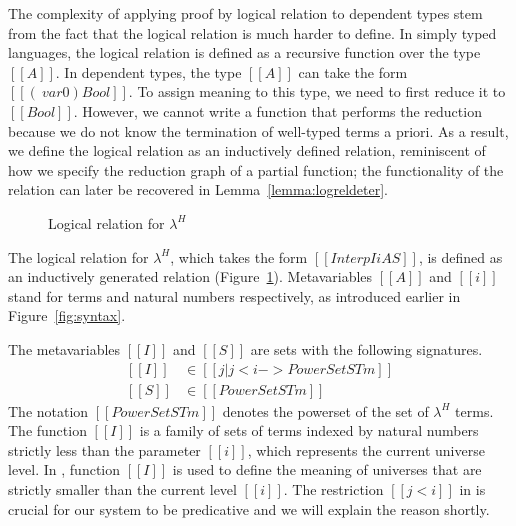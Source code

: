 \documentclass[acmsmall,screen=true,
\ifpublic review=false\else,review=true\fi
  ,anonymous=\ifanonymous true\else false\fi]{acmart}
\newcommand{\lang}{$\lambda^H$\xspace}
\newcommand{\scw}[1]{}
\newcommand{\yl}[1]{}
\begin{document}
The complexity of applying proof by logical relation to dependent types stem
from the fact that the logical relation is much harder to define. In
simply typed languages, the logical relation is defined as a recursive
function over the type $[[A]]$. In dependent types, the type
$[[A]]$ can take the form $[[(\ var 0) Bool]]$. To assign meaning to
this type, we need to first reduce it to $[[Bool]]$. However, we
cannot write a function that performs the reduction because we do not
know the termination of well-typed terms a priori. As a result, we
define the logical relation as an inductively defined relation,
reminiscent of how we specify the reduction graph of a partial
function; the functionality of the relation can later be recovered in Lemma~\ref{lemma:logreldeter}.

\label{sec:logreldep}
\begin{figure}[h]
\caption{Logical relation for \lang}
\label{fig:logrel}
\end{figure}
The logical relation for \lang{}, which takes the form $[[Interp I i A
S]]$, is defined as an inductively generated relation (Figure~\ref{fig:logrel}).
Metavariables $[[A]]$ and $[[i]]$ stand for terms and natural
numbers respectively, as introduced earlier in
Figure~\ref{fig:syntax}.
\scw{Many introductory texts define the relation as a recursive function
over type structure, or step-indices. You use an inductive relation instead, why?}
\scw{Is it worth observing here that this definition is not over sets of typed
terms. That it characterizes all terms that look like booleans (i.e. evaluate to
true or false) or all terms that look like proofs (i.e. evaluate to refl). The
fact that there is no connection between p and a and b in the I-Eq case is strange
looking. Need to explain.  }
The metavariables $[[I]]$ and $[[S]]$ are
sets with the following signatures.
\begin{equation*}
  \begin{split}
    [[I]] &\in [[ { j | j < i  } ->  PowerSet STm ]] \\
    [[S]] &\in [[PowerSet STm]]
  \end{split}
\end{equation*}
The notation $[[PowerSet STm]]$ denotes the powerset of the set of
\lang{} terms.
The function $[[I]]$ is a family of sets of terms indexed by
natural numbers strictly less than the parameter $[[i]]$, which
represents the current universe level.  In , function
$[[I]]$ is used to define the meaning of
universes that are strictly smaller than the current level $[[i]]$. The
restriction $[[j < i]]$ in  is crucial for our system to
be predicative and we will explain the reason shortly.
\end{document}
